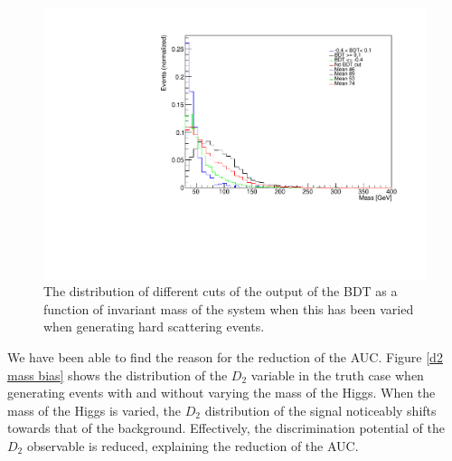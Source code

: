 \documentclass[10pt,a4paper]{book}
\begin{document}
\begin{figure}
\centering
\includegraphics[scale=0.6]{ch4_images/bdt_cuts_mass_bias}
\caption{The distribution of different cuts of the output of the BDT as a function of invariant mass of the system when this has been varied when generating hard scattering events.}
\label{bdt inv mass}
\end{figure}

We have been able to find the reason for the reduction of the AUC. Figure \ref{d2 mass bias} shows the distribution of the $D_2$ variable in the truth case when generating events with and without varying the mass of the Higgs. When the mass of the Higgs is varied, the $D_2$ distribution of the signal noticeably shifts towards that of the background. Effectively, the discrimination potential of the $D_2$ observable is reduced, explaining the reduction of the AUC.
\end{document}
